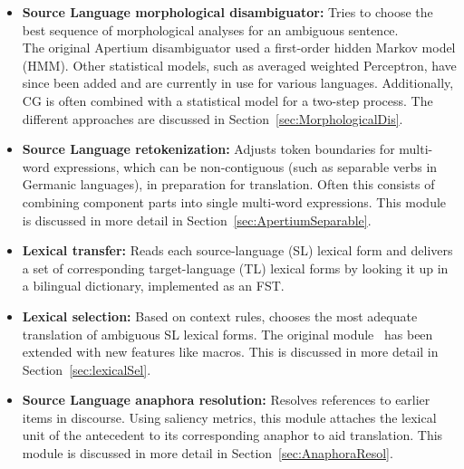 \documentclass[free]{flammie}
\begin{document}
\begin{itemize}
    \item \textbf{Source Language morphological disambiguator:} Tries to choose
        the best sequence of morphological analyses for an ambiguous sentence.
        \\The original Apertium disambiguator used a first-order hidden Markov
        model (HMM). Other statistical models, such as averaged weighted
        Perceptron, have since been added and are currently in use for various
        languages. Additionally, CG \cite{bick2015cg} is often combined with a
        statistical model for a two-step process.  The different approaches are
        discussed in Section~\ref{sec:MorphologicalDis}.
\end{itemize}

\begin{itemize}
    \item \textbf{Source Language retokenization:} Adjusts token boundaries for
        multi-word expressions, which can be non-contiguous (such as separable
        verbs in Germanic languages), in preparation for translation.  Often
        this consists of combining component parts into single multi-word
        expressions.  This module is discussed in more detail in
        Section~\ref{sec:ApertiumSeparable}.
\end{itemize}

\begin{itemize}
    \item \textbf{Lexical transfer:} Reads each source-language (SL) lexical
        form and delivers a set of corresponding target-language (TL) lexical
        forms by looking it up in a bilingual dictionary, implemented as an FST.
\end{itemize}

\begin{itemize}
    \item \textbf{Lexical selection:} Based on context rules, chooses the most
        adequate translation of ambiguous SL lexical forms. The original
        module~\cite{tyers2012flexible} has been extended with new features
        like macros.  This is discussed in more detail in
        Section~\ref{sec:lexicalSel}.
\end{itemize}

\begin{itemize}
    \item \textbf{Source Language anaphora resolution:} Resolves references to
        earlier items in discourse. Using saliency metrics, this module attaches
        the lexical unit of the antecedent to its corresponding anaphor to aid
        translation. This module is discussed in more detail in
        Section~\ref{sec:AnaphoraResol}.
\end{itemize}
\end{document}
